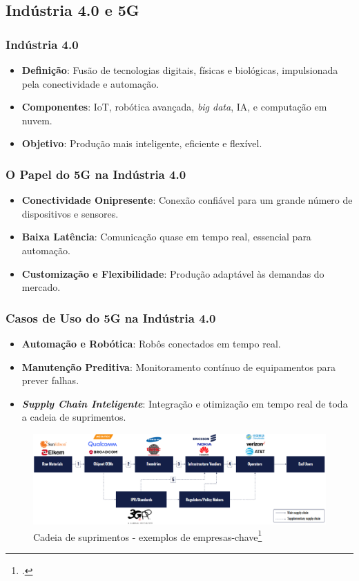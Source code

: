 \subsection{Indústria 4.0 e 5G}
\begin{frame}
    \frametitle{Indústria 4.0}
    \begin{itemize}
        \item \textbf{Definição}: Fusão de tecnologias digitais, físicas e biológicas, impulsionada pela conectividade e automação.
        \item \textbf{Componentes}: IoT, robótica avançada, \textit{big data}, IA, e computação em nuvem.
        \item \textbf{Objetivo}: Produção mais inteligente, eficiente e flexível.
    \end{itemize}
\end{frame}

\begin{frame}
    \frametitle{O Papel do 5G na Indústria 4.0}
    \begin{itemize}
        \item \textbf{Conectividade Onipresente}: Conexão confiável para um grande número de dispositivos e sensores.
        \item \textbf{Baixa Latência}: Comunicação quase em tempo real, essencial para automação.
        \item \textbf{Customização e Flexibilidade}: Produção adaptável às demandas do mercado.
    \end{itemize}
\end{frame}

\begin{frame}
    \frametitle{Casos de Uso do 5G na Indústria 4.0}
    \begin{itemize}
        \item \textbf{Automação e Robótica}: Robôs conectados em tempo real.
        \item \textbf{Manutenção Preditiva}: Monitoramento contínuo de equipamentos para prever falhas.
        \item \textbf{\textit{Supply Chain Inteligente}}: Integração e otimização em tempo real de toda a cadeia de suprimentos.
    \end{itemize}
    \begin{figure}
        \centering
        \includegraphics[width=\linewidth]{figs/supply_chain.png}
        \caption{Cadeia de suprimentos - exemplos de empresas-chave\footcite{ABI2021SupplyChain}}
    \end{figure}
\end{frame}

